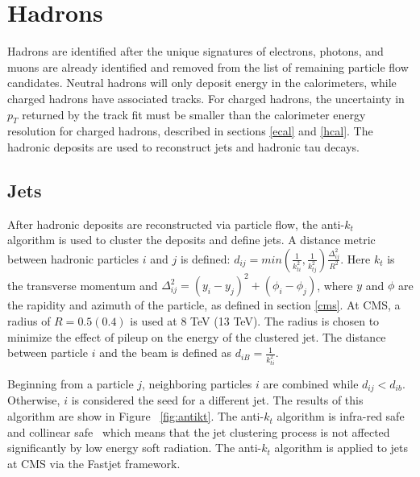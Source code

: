 \documentclass[oneside, letterpaper, oldfontcommands]{memoir}
\begin{document}
\section{Hadrons}\label{hadrons}
Hadrons are identified after the unique signatures of electrons, photons, and muons are already identified and removed from the list of remaining particle flow candidates. Neutral hadrons will only deposit energy in the calorimeters, while charged hadrons have associated tracks. For charged hadrons, the uncertainty in $p_{T}$ returned by the track fit must be smaller than the calorimeter energy resolution for charged hadrons, described in sections \ref{ecal} and \ref{hcal}. The hadronic deposits are used to reconstruct jets and hadronic tau decays.

\subsection{Jets}\label{jets}
\qquad After hadronic deposits are reconstructed via particle flow, the anti-$k_{t}$ ~\cite{Cacciari:2008gp} algorithm is used to cluster the deposits and define jets. A distance metric between hadronic particles $i$ and $j$ is defined: $d_{ij} = min(\frac{1}{k_{ti}^{2}},\frac{1}{k_{tj}^{2}})\frac{\Delta_{ij}^{2}}{R^{2}}$. Here $k_{t}$ is the transverse momentum and $\Delta_{ij}^{2} = (y_{i}-y_{j})^{2} + (\phi_{i} - \phi_{j})$, where $y$ and $\phi$ are the rapidity and azimuth of the particle, as defined in section \ref{cms}. At CMS, a radius of $R = 0.5 (0.4)$ is used at 8 TeV (13 TeV). The radius is chosen to minimize the effect of pileup on the energy of the clustered jet. The distance between particle $i$ and the beam is defined as $d_{iB} = \frac{1}{k_{ti}^{2}}$.

\qquad Beginning from a particle $j$, neighboring particles $i$ are combined while $d_{ij} < d_{ib}$. Otherwise, $i$ is considered the seed for a different jet. The results of this algorithm are show in Figure ~\ref{fig:antikt}. The anti-$k_{t}$ algorithm is infra-red safe and collinear safe~\cite{Cacciari:2008gp} which means that the jet clustering process is not affected significantly by low energy soft radiation. The anti-$k_{t}$ algorithm is applied to jets at CMS via the {\sc Fastjet} framework\cite{Cacciari:2011ma}.
\end{document}
